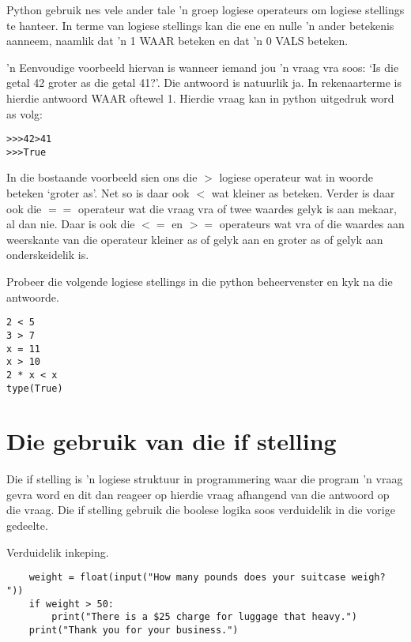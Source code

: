 Python gebruik nes vele ander tale 'n groep logiese operateurs om logiese stellings te hanteer.  In terme van logiese stellings kan die ene en nulle 'n ander betekenis aanneem, naamlik dat 'n 1 WAAR beteken en dat 'n 0 VALS beteken.  

'n Eenvoudige voorbeeld hiervan is wanneer iemand jou 'n vraag vra soos:  `Is die getal 42 groter as die getal 41?'.  Die antwoord is natuurlik ja.  In rekenaarterme is hierdie antwoord WAAR oftewel 1.  Hierdie vraag kan in python uitgedruk word as volg:

\begin{lstlisting}[style=DOS]
>>>42>41
>>>True
\end{lstlisting}

In die bostaande voorbeeld sien ons die $>$ logiese operateur wat in woorde beteken `groter as'.  Net so is daar ook $<$ wat kleiner as beteken.  Verder is daar ook die $==$ operateur wat die vraag vra of twee waardes gelyk is aan mekaar, al dan nie.  Daar is ook die $<=$ en $>=$ operateurs wat vra of die waardes aan weerskante van die operateur kleiner as of gelyk aan en groter as of gelyk aan onderskeidelik is.

Probeer die volgende logiese stellings in die python beheervenster en kyk na die antwoorde.

\lstset{language=Python}
\lstset{frame=lines}
\lstset{basicstyle=\footnotesize}
\begin{lstlisting}
2 < 5
3 > 7
x = 11
x > 10
2 * x < x
type(True)
\end{lstlisting}



\section{Die gebruik van die if stelling}
Die if stelling is 'n logiese struktuur in programmering waar die program 'n vraag gevra word en dit dan reageer op hierdie vraag afhangend van die antwoord op die vraag.  Die if stelling gebruik die boolese logika soos verduidelik in die vorige gedeelte.

Verduidelik inkeping.


\lstset{language=Python}
\lstset{frame=lines}
\lstset{basicstyle=\footnotesize}
\begin{lstlisting}
    weight = float(input("How many pounds does your suitcase weigh? "))
    if weight > 50:
        print("There is a $25 charge for luggage that heavy.")
    print("Thank you for your business.")
\end{lstlisting}

